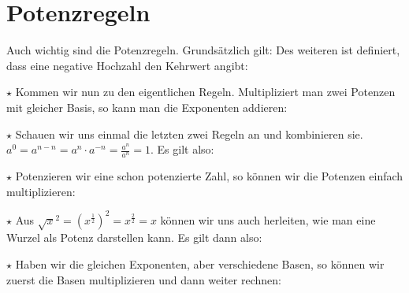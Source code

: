 \section{Potenzregeln}
	Auch wichtig sind die Potenzregeln. Grundsätzlich gilt:
	\formel{\[\underbrace{a\cdot a\cdot a\cdot\ldots\cdot a}_{n-Mal}=a^n\]}
	Des weiteren ist definiert, dass eine negative Hochzahl den Kehrwert angibt:
	\formel{\[\frac{1}{x^n}=x^{-n}\]}
	
	\(\star\) Kommen wir nun zu den eigentlichen Regeln. Multipliziert man zwei
	Potenzen mit gleicher Basis, so kann man die Exponenten addieren:
	\formel{\[a^m\cdot a^n=a^{m+n}\]}
	
	\(\star\) Schauen wir uns einmal die letzten zwei Regeln an und kombinieren
	sie. \(a^0=a^{n-n}=a^n\cdot a^{-n}=\frac{a^n}{a^n}=1\). Es gilt also:
	\formel{\[a^0=1,\text{ für }a\neq 0\]}
	
	\(\star\) Potenzieren wir eine schon potenzierte
	Zahl, so können wir die Potenzen einfach multiplizieren:
	\formel{\[\left ( a^n \right )^m=a^{n\cdot m}\]}
	
	\(\star\) Aus \(\sqrt{x}^2=\left ( x^{\frac{1}{2}}\right
	)^2=x^{\frac{2}{2}}=x\) können wir uns auch herleiten, wie man eine Wurzel als
	Potenz darstellen kann. Es gilt dann also:
	\formel{\[\sqrt[n]{x}=x^{\frac{1}{n}}\]}
	
	\(\star\) Haben wir die gleichen Exponenten, aber verschiedene Basen, so können
	wir zuerst die Basen multiplizieren und dann weiter rechnen:
	\formel{\[a^n\cdot b^n=(a\cdot b)^n, \textrm{\ bzw\ } \frac{a^n}{b^n}=\left (
	\frac{a}{b}\right ) ^n\]}

